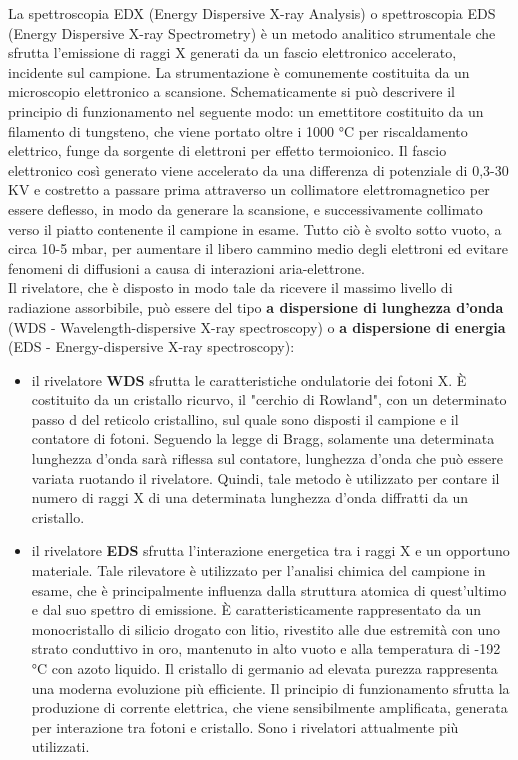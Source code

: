 La spettroscopia EDX (Energy Dispersive X-ray Analysis) o spettroscopia EDS (Energy Dispersive X-ray Spectrometry) è un metodo analitico strumentale che sfrutta l'emissione di raggi X generati da un fascio elettronico accelerato, incidente sul campione. La strumentazione è comunemente costituita da un microscopio elettronico a scansione. Schematicamente si può descrivere il principio di funzionamento nel seguente modo: un emettitore costituito da un filamento di tungsteno, che viene portato oltre i 1000 °C per riscaldamento elettrico, funge da sorgente di elettroni per effetto termoionico. Il fascio elettronico così generato viene accelerato da una differenza di potenziale di 0,3-30 KV e costretto a passare prima attraverso un collimatore elettromagnetico per essere deflesso, in modo da generare la scansione, e successivamente collimato verso il piatto contenente il campione in esame. Tutto ciò è svolto sotto vuoto, a circa 10-5 mbar, per aumentare il libero cammino medio degli elettroni ed evitare fenomeni di diffusioni a causa di interazioni aria-elettrone.\\
Il rivelatore, che è disposto in modo tale da ricevere il massimo livello di radiazione assorbibile, può essere del tipo \textbf{a dispersione di lunghezza d'onda} (WDS - Wavelength-dispersive X-ray spectroscopy) o \textbf{a dispersione di energia} (EDS - Energy-dispersive X-ray spectroscopy):
\begin{itemize}
    \item il rivelatore \textbf{WDS} sfrutta le caratteristiche ondulatorie dei fotoni X. È costituito da un cristallo
ricurvo, il "cerchio di Rowland", con un determinato passo d del reticolo cristallino, sul quale sono disposti il campione e il contatore di fotoni. Seguendo la legge di Bragg, solamente una determinata lunghezza d'onda sarà riflessa sul contatore, lunghezza d'onda che può essere variata ruotando il rivelatore. Quindi, tale metodo è utilizzato per contare il numero di raggi X di una determinata lunghezza d’onda diffratti da un cristallo.
\item il rivelatore \textbf{EDS} sfrutta l'interazione energetica tra i raggi X e un opportuno materiale. Tale
rilevatore è utilizzato per l’analisi chimica del campione in esame, che è principalmente influenza dalla struttura atomica di quest’ultimo e dal suo spettro di emissione. È caratteristicamente rappresentato da un monocristallo di silicio drogato con litio, rivestito alle due estremità con uno strato conduttivo in oro, mantenuto in alto vuoto e alla temperatura di -192 °C con azoto liquido. Il cristallo di germanio ad elevata purezza rappresenta una moderna evoluzione più efficiente. Il principio di funzionamento sfrutta la produzione di corrente elettrica, che viene sensibilmente amplificata, generata per interazione tra fotoni e cristallo. Sono i rivelatori attualmente più utilizzati.
\end{itemize}

